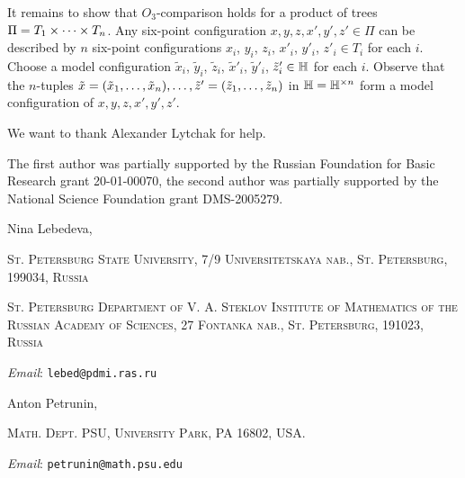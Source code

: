 \documentclass{article}
\makeatletter
\newcommand{\Addresses}{{\bigskip\footnotesize

\noindent Nina Lebedeva,
\par\nopagebreak
 \textsc{St. Petersburg State University, 7/9 Universitetskaya nab., St. Petersburg, 199034, Russia}
\par
\nopagebreak
 \textsc{St. Petersburg Department of V. A. Steklov Institute of Mathematics of the Russian Academy of Sciences, 27 Fontanka nab., St. Petersburg, 191023, Russia}
  \par\nopagebreak
  \textit{Email}: \texttt{lebed@pdmi.ras.ru}

\medskip

\noindent   Anton Petrunin, 
\par\nopagebreak
 \textsc{Math. Dept. PSU, University Park, PA 16802, USA.}
  \par\nopagebreak
  \textit{Email}: \texttt{petrunin@math.psu.edu}
  
}}
\makeatother
\begin{document}
It remains to show that $O_3$-comparison holds for a product of trees $\Pi\z=T_1\times \dots\times T_n$.
Any six-point configuration $x,y,z,x',y',z'\in \Pi$ can be described by $n$ six-point configurations $x_i$, $y_i$, $z_i$, $x'_i$, $y'_i$, $z'_i\in T_i$ for each $i$.
Choose a model configuration $\tilde x_i$, $\tilde y_i$, $\tilde z_i$, $\tilde x'_i$, $\tilde y'_i$, $\tilde z'_i\in \mathbb H$ for each $i$.
Observe that the $n$-tuples $\tilde x=(\tilde x_1,\dots, \tilde x_n),\z\dots,\tilde z'=(\tilde z_1,\dots, \tilde z_n)$ in $\mathbb H=\mathbb H^{\times n}$ form a model configuration of $x,y,z,x',y',z'$.
\qeds

We want to thank Alexander Lytchak for help. 

The first author was partially supported by the Russian Foundation for Basic Research grant 20-01-00070, the second author was partially supported by the National Science Foundation grant DMS-2005279.

{\sloppy
\printbibliography[heading=bibintoc]
\fussy
}

\Addresses
\end{document}
